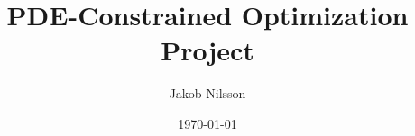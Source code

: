 \documentclass[12pt,a4paper]{article}
\title{PDE-Constrained Optimization Project}
\author{Jakob Nilsson}
\date{\today}
\begin{document}
\maketitle
\vfill
\tableofcontents
\newpage


\end{document}
